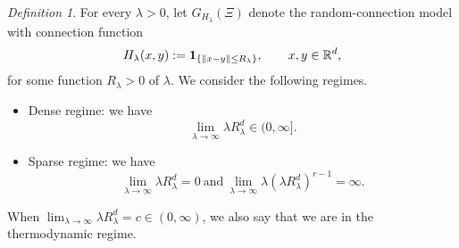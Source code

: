 \documentclass[bj,authoryear,noshowframe]{imsart}
\theoremstyle{plain}
\theoremstyle{remark}
\newtheorem{definition}[theorem]{Definition}
\newcommand{\R}{\mathbb{R}}
\newcommand{\bone}{{\bf 1}}
\begin{document}
 \vspace{-0.2cm}
 
 \begin{definition}
   For every $\lambda >0$,
   let $G_{H_\lambda} (\Xi)$
   denote the random-connection model
   with connection function 
   $$
   H_\lambda (x,y):=\bone_{\{\|x-y\|\leq R_\lambda\}},
   \qquad x,y\in\R^d,
   $$
   for some function $R_\lambda>0$ of $\lambda$.
  We consider the following regimes. 
 \begin{itemize}
 \item Dense regime: we have 
 $$ 
     \lim_{\lambda\to \infty} \lambda R_\lambda^d \in (0,\infty]. 
 $$
 \item Sparse regime: we have 
 $$ 
  \lim_{\lambda\to \infty} \lambda R_\lambda^d = 0
 \ \mathrm{and} \
 \lim_{\lambda\to \infty}
 \lambda(\lambda R_\lambda^d)^{r-1} = \infty.
 $$
 \end{itemize} 
 \end{definition}
 
 \vspace{-0.4cm}
 
 \noindent
 When $\lim_{\lambda\to \infty} \lambda R_\lambda^d = c \in (0,\infty )$, 
 we also say that we are in the thermodynamic regime.
 
  \vspace{-0.2cm}
 
\end{document}
